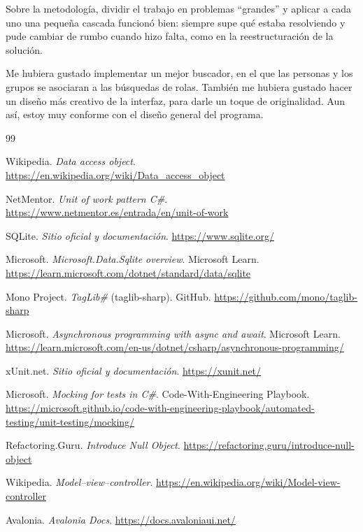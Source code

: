 \documentclass{article}
\begin{document}
Sobre la metodología, dividir el trabajo en problemas ``grandes'' y aplicar a
cada uno una pequeña cascada funcionó bien: siempre supe qué estaba
resolviendo y pude cambiar de rumbo cuando hizo falta, como en la
reestructuración de la solución.

Me hubiera gustado implementar un mejor buscador, en el que las personas y
los grupos se asociaran a las búsquedas de rolas. También me hubiera gustado
hacer un diseño más creativo de la interfaz, para darle un toque de
originalidad. Aun así, estoy muy conforme con el diseño general del programa.

\renewcommand{\refname}{Bibliografía}

\begin{thebibliography}{99}

	Wikipedia. \emph{Data access object}.
	\url{https://en.wikipedia.org/wiki/Data_access_object}

	NetMentor. \emph{Unit of work pattern C\#}.
	\url{https://www.netmentor.es/entrada/en/unit-of-work}

	SQLite. \emph{Sitio oficial y documentación}.
	\url{https://www.sqlite.org/}

	Microsoft. \emph{Microsoft.Data.Sqlite overview}. Microsoft Learn.
	\url{https://learn.microsoft.com/dotnet/standard/data/sqlite}

	Mono Project. \emph{TagLib\#} (taglib-sharp). GitHub.
	\url{https://github.com/mono/taglib-sharp}

	Microsoft. \emph{Asynchronous programming with async and await}.
	Microsoft Learn.
	\url{https://learn.microsoft.com/en-us/dotnet/csharp/asynchronous-programming/}

	xUnit.net. \emph{Sitio oficial y documentación}.
	\url{https://xunit.net/}

	Microsoft. \emph{Mocking for tests in C\#}. Code-With-Engineering
	Playbook.
	\url{https://microsoft.github.io/code-with-engineering-playbook/automated-testing/unit-testing/mocking/}

	Refactoring.Guru. \emph{Introduce Null Object}.
	\url{https://refactoring.guru/introduce-null-object}

	Wikipedia. \emph{Model--view--controller}.
	\url{https://en.wikipedia.org/wiki/Model-view-controller}

	Avalonia. \emph{Avalonia Docs}.
	\url{https://docs.avaloniaui.net/}


\end{thebibliography}
\end{document}
